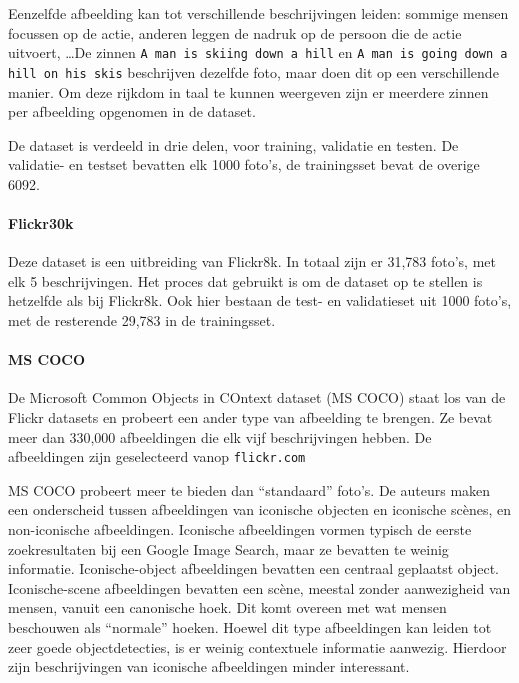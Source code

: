 Eenzelfde afbeelding kan tot verschillende beschrijvingen leiden: sommige mensen focussen op de actie, anderen leggen de nadruk op de persoon die de actie uitvoert, \ldots De zinnen \texttt{A man is skiing down a hill} en \texttt{A man is going down a hill on his skis} beschrijven dezelfde foto, maar doen dit op een verschillende manier. Om deze rijkdom in taal te kunnen weergeven zijn er meerdere zinnen per afbeelding opgenomen in de dataset.

De dataset is verdeeld in drie delen, voor training, validatie en testen. De validatie- en testset bevatten elk 1000 foto's, de trainingsset bevat de overige 6092.


\paragraph{Flickr30k}
\label{par:Flickr30k}
Deze dataset \cite{Young2014} is een uitbreiding van Flickr8k. In totaal zijn er 31,783 foto's, met elk 5 beschrijvingen. Het proces dat gebruikt is om de dataset op te stellen is hetzelfde als bij Flickr8k\cite{Hodosh2013}. Ook hier bestaan de test- en validatieset uit 1000 foto's, met de resterende 29,783 in de trainingsset.

\paragraph{MS COCO}
\label{par:MS COCO}
De Microsoft Common Objects in COntext dataset (MS COCO) \cite{Lin2014} staat los van de Flickr datasets en probeert een ander type van afbeelding te brengen. Ze bevat meer dan 330,000 afbeeldingen die elk vijf beschrijvingen hebben. De afbeeldingen zijn geselecteerd vanop \texttt{flickr.com}

MS COCO probeert meer te bieden dan ``standaard'' foto's. De auteurs maken een onderscheid tussen afbeeldingen van iconische objecten en iconische sc\`enes, en non-iconische afbeeldingen. Iconische afbeeldingen vormen typisch de eerste zoekresultaten bij een Google Image Search, maar ze bevatten te weinig informatie. Iconische-object afbeeldingen bevatten een centraal geplaatst object. Iconische-scene afbeeldingen bevatten een sc\`ene, meestal zonder aanwezigheid van mensen, vanuit een canonische hoek. Dit komt overeen met wat mensen beschouwen als ``normale'' hoeken. Hoewel dit type afbeeldingen kan leiden tot zeer goede objectdetecties, is er weinig contextuele informatie aanwezig. Hierdoor zijn beschrijvingen van iconische afbeeldingen minder interessant.

